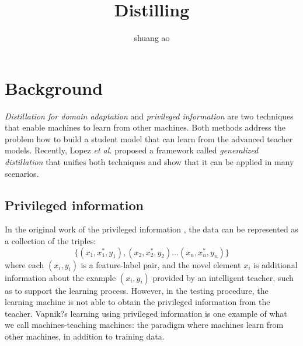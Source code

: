 \documentclass[11pt,onecolumn]{article}
\author{shuang ao\\
}
\title{
\large\textbf{Distilling}
}
\begin{document}
\maketitle
\section{Background}
\textit{Distillation for domain adaptation} \cite{hinton2015distilling} and \textit{privileged information} \cite{vapnik2015learning} are two techniques that enable machines to learn from other machines. Both methods address the problem how to build a student model that can learn from the advanced teacher models. Recently, Lopez \textit{et al.} \cite{lopez2015unifying} proposed a framework called \textit{generalized distillation} that unifies both techniques and show that it can be applied in many scenarios.
\subsection{Privileged information}
In the original work of the privileged information \cite{vapnik2015learning}, the data can be represented as a collection of the triples:
\[\{\left(x_1,x_1^*,y_1\right),\left(x_2,x_2^*,y_2\right) \dots \left(x_n,x_n^*,y_n\right)\}\]
where each $(x_i,y_i)$ is a feature-label pair, and the novel element $x_i$ is additional information about the example $(x_i,y_i)$ provided by an intelligent teacher, such as to support the learning process. However, in the testing procedure, the learning machine is not able to obtain the privileged information from the teacher. Vapnik?s learning using privileged information is one example of what we call machines-teaching machines: the paradigm where machines learn from other machines, in addition to training data. 
\end{document}
